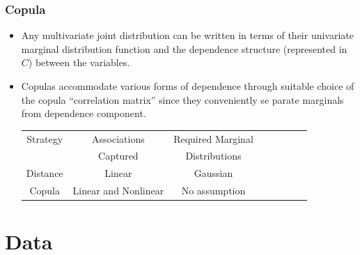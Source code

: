 \documentclass[pdf,9pt,xcolor=dvipsnames,hide notes]{beamer}
\begin{document}
\begin{frame}[label=frame4b]
	\frametitle{Copula}
	
	
	\begin{itemize}
	\justifying
		
		\item Any multivariate joint distribution can be written in terms of their univariate marginal distribution function and the dependence structure (represented in $C$) between the variables.
		
		\pause
		\vspace{0.3cm}
		
		\item Copulas accommodate various forms of dependence through suitable choice of the copula ``correlation matrix'' since they conveniently se \linebreak parate marginals from dependence component.
		
		\pause
		\vspace{0.3cm}
		
		
		\begin{table}[ht]
			\centering
			\begin{tabular}{c|ccccccc}
				\hline
				\rowcolor{corn}
				Strategy & Associations & Required Marginal \\
				\rowcolor{corn}
				& Captured & Distributions \\
				\hline
				Distance& Linear & Gaussian \\
				Copula& Linear and Nonlinear & No assumption \\
				\hline
			\end{tabular}
		\end{table}
		
	\end{itemize}
\end{frame}

	\section{Data}	
\end{document}
